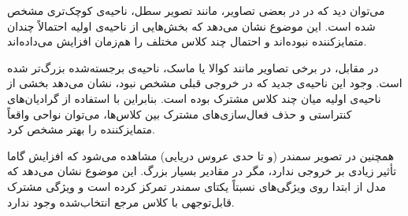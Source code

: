 می‌توان دید که در 
در بعضی تصاویر، مانند تصویر سطل، ناحیه‌ی کوچک‌تری مشخص شده است. این موضوع نشان می‌دهد که بخش‌هایی از ناحیه‌ی اولیه احتمالاً چندان متمایزکننده نبوده‌اند و احتمال چند کلاس مختلف را هم‌زمان افزایش می‌داده‌اند. 

در مقابل، در برخی تصاویر مانند کوالا یا ماسک، ناحیه‌ی برجسته‌شده بزرگ‌تر شده است. وجود این ناحیه‌ی جدید که در خروجی قبلی مشخص نبود، نشان می‌دهد بخشی از ناحیه‌ی اولیه میان چند کلاس مشترک بوده است. بنابراین با استفاده از گرادیان‌های کنتراستی و حذف فعال‌سازی‌های مشترک بین کلاس‌ها، می‌توان نواحی واقعاً متمایزکننده را بهتر مشخص کرد. 

همچنین در تصویر سمندر (و تا حدی عروس دریایی) مشاهده می‌شود که افزایش گاما تأثیر زیادی بر خروجی ندارد، مگر در مقادیر بسیار بزرگ. این موضوع نشان می‌دهد که مدل از ابتدا روی ویژگی‌های نسبتاً یکتای سمندر تمرکز کرده است و ویژگی مشترک قابل‌توجهی با کلاس مرجع انتخاب‌شده وجود ندارد.